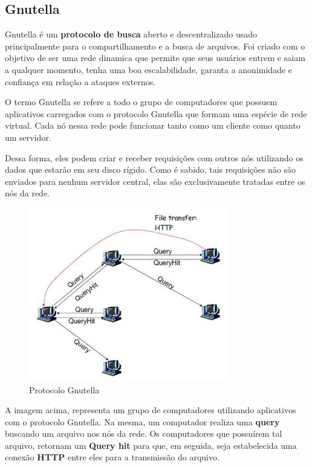 \documentclass[a4paper]{article}
\begin{document}
\subsection{Gnutella} %
Gnutella é um \textbf{protocolo de busca} aberto e descentralizado usado principalmente para o compartilhamento e a busca de arquivos. Foi criado com o objetivo de ser uma rede dinamica que permite que seus usuários entrem e saiam a qualquer momento, tenha uma boa escalabilidade, garanta a anonimidade  e confiança em relação a ataques externos.\cite{gayatriGN}

O termo Gnutella se refere a todo o grupo de computadores que possuem aplicativos carregados com o protocolo Gnutella que formam uma espécie de rede virtual. Cada nó nessa rede pode funcionar tanto como um cliente como quanto um servidor. 

Dessa forma, eles podem criar e receber requisições com outros nós utilizando os dados que estarão em seu disco rígido. Como é sabido, tais requisições não são enviados para nenhum servidor central, elas são exclusivamente tratadas entre os nós da rede. 

\begin{figure}[!h]
\begin{center}
  \includegraphics{img//gnuquery.JPG} 
  \caption{Protocolo Gnutella \cite{examplesofp2p} \label{figure1}}
\end{center}
\end{figure}


A imagem acima, representa um grupo de computadores utilizando aplicativos com o protocolo Gnutella. Na mesma, um computador realiza uma \textbf{query} buscando um arquivo nos nós da rede. Os computadores que possuírem tal arquivo, retornam um \textbf{Query hit} para que, em seguida, seja estabelecida uma conexão \textbf{HTTP} entre eles para a transmissão do arquivo. 
\end{document}
